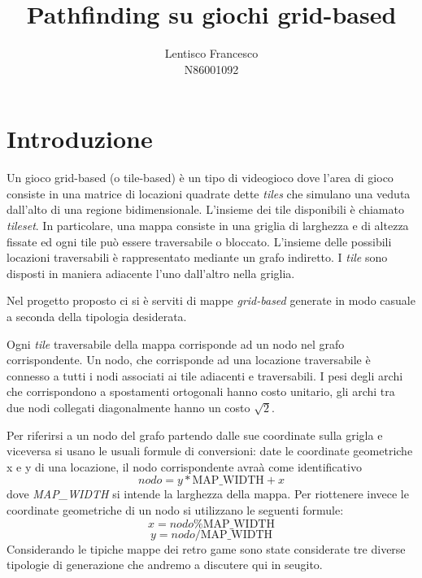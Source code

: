 \documentclass[11pt]{book}
\title{\textbf{Pathfinding su giochi grid-based}}
\author{Lentisco Francesco\\
N86001092}
\date{}
\begin{document}
\maketitle


\chapter{Introduzione}

Un gioco grid-based (o tile-based) \`e un tipo di videogioco dove l'area di gioco consiste in una matrice di locazioni quadrate dette \emph{tiles} che simulano una veduta dall'alto di una regione bidimensionale. L'insieme dei tile disponibili \`e chiamato \emph{tileset}. In particolare, una mappa consiste in una griglia di larghezza e di altezza fissate ed ogni tile pu\`o essere traversabile o bloccato. L'insieme delle possibili locazioni traversabili \`e rappresentato mediante un grafo indiretto.  I \emph{tile} sono disposti in maniera adiacente l'uno dall'altro nella griglia. \par Nel progetto proposto ci si \`e serviti di mappe \emph{grid-based} generate in modo casuale a seconda della tipologia desiderata.\par Ogni \emph{tile} traversabile della mappa corrisponde ad un nodo nel grafo corrispondente. Un nodo, che corrisponde ad una locazione traversabile \`e connesso a tutti i nodi associati ai tile adiacenti e traversabili. I pesi degli archi che corrispondono a spostamenti ortogonali hanno costo unitario, gli archi tra due nodi collegati diagonalmente hanno un costo $\sqrt{2}$. \par Per riferirsi a un nodo del grafo partendo dalle sue coordinate sulla grigla e viceversa si usano le usuali formule di conversioni:
date le coordinate geometriche x e y di una locazione, il nodo corrispondente avra\`a come identificativo \begin{equation} nodo = y*\mbox{MAP\_WIDTH} + x \end{equation} dove \emph{MAP\_WIDTH} si intende la larghezza della mappa. Per riottenere invece le coordinate geometriche di un nodo si utilizzano le seguenti formule: \begin{equation} x = nodo \% \mbox{MAP\_WIDTH} \end{equation} \begin{equation} y = nodo / \mbox{MAP\_WIDTH} \end{equation} 
Considerando le tipiche mappe dei retro game sono state considerate tre diverse tipologie di generazione che andremo a discutere qui in seugito.
\end{document}
